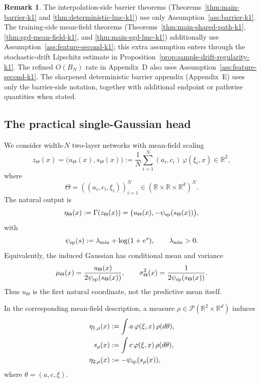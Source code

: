 \documentclass[11pt]{article}
\theoremstyle{definition}
\newtheorem{remark}[theorem]{Remark}
\newcommand{\R}{\mathbb{R}}
\newcommand{\mc}[1]{\mathcal{#1}}
\begin{document}
\begin{remark}
The interpolation-side barrier theorems
(Theorems~\ref{thm:main-barrier-k1} and \ref{thm:deterministic-lmc-k1}) use
only Assumption~\ref{ass:barrier-k1}. The training-side mean-field theorems
(Theorems~\ref{thm:main-shared-path-k1}, \ref{thm:sgd-mean-field-k1}, and
\ref{thm:main-sgd-lmc-k1}) additionally use
Assumption~\ref{ass:feature-second-k1}; this extra assumption enters through
the stochastic-drift Lipschitz estimate in
Proposition~\ref{prop:sample-drift-regularity-k1}. The refined $O(B_N)$ rate in
Appendix~D also uses Assumption~\ref{ass:feature-second-k1}. The sharpened
deterministic barrier appendix (Appendix~E) uses only the barrier-side
notation, together with additional endpoint or pathwise quantities when stated.
\end{remark}

\subsection{The practical single-Gaussian head}

We consider width-$N$ two-layer networks with mean-field scaling
\begin{equation}
  z_\Theta(x)
  =
  \bigl(u_\Theta(x),s_\Theta(x)\bigr)
  :=
  \frac1N\sum_{i=1}^N (a_i,c_i)\,\varphi(\xi_i,x)
  \in \R^2,
  \label{eq:raw_head}
\end{equation}
where
\[
  \Theta=((a_i,c_i,\xi_i))_{i=1}^N\in(\R\times\R\times\R^d)^N.
\]
The natural output is
\begin{equation}
  \eta_\Theta(x)
  :=
  \Gamma(z_\Theta(x))
  =
  \bigl(u_\Theta(x),-\psi_{\rm sp}(s_\Theta(x))\bigr),
  \label{eq:natural_head}
\end{equation}
with
\[
  \psi_{\rm sp}(s):=\lambda_{\min}+\log(1+e^s),
  \qquad
  \lambda_{\min}>0.
\]
Equivalently, the induced Gaussian has conditional mean and variance
\[
  \mu_\Theta(x)=\frac{u_\Theta(x)}{2\psi_{\rm sp}(s_\Theta(x))},
  \qquad
  \sigma_\Theta^2(x)=\frac{1}{2\psi_{\rm sp}(s_\Theta(x))}.
\]
Thus $u_\Theta$ is the first natural coordinate, not the predictive mean
itself.

In the corresponding mean-field description, a measure
$\rho\in\mc{P}(\R^2\times\R^d)$ induces
\begin{align}
  \eta_{1,\rho}(x)
  &:=
  \int a\,\varphi(\xi,x)\,\rho(d\theta),
  \\
  s_\rho(x)
  &:=
  \int c\,\varphi(\xi,x)\,\rho(d\theta),
  \\
  \eta_{2,\rho}(x)
  &:=
  -\psi_{\rm sp}(s_\rho(x)),
\end{align}
where $\theta=(a,c,\xi)$.
\end{document}
